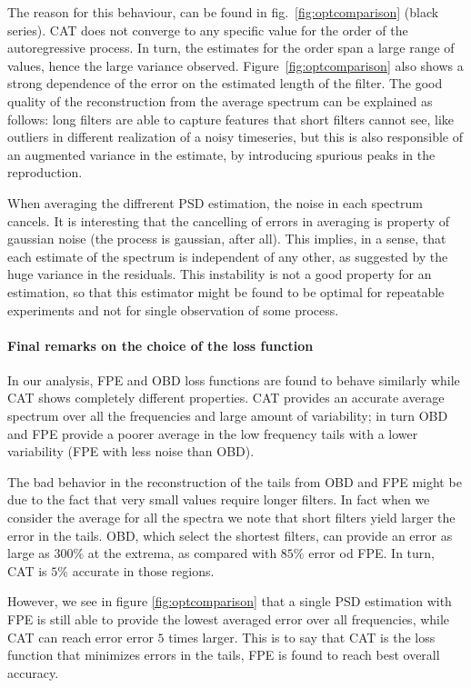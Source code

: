 \documentclass[twocolumn,showpacs,preprintnumbers,nofootinbib,prd,
superscriptaddress,10pt]{revtex4-1}
\begin{document}
The reason for this behaviour, can be found in fig.~\ref{fig:optcomparison} (black series). CAT does not converge to any specific value for the order of the autoregressive process.
In turn, the estimates for the order span a large range of values, hence the large variance observed.
Figure~\ref{fig:optcomparison} also shows a strong dependence of the error on the estimated length of the filter. The good quality of the reconstruction from the average spectrum can be explained as follows: long filters are able to capture features that short filters cannot see, like outliers in different realization of a noisy timeseries, but this is also responsible of an augmented variance in the estimate, by introducing spurious peaks in the reproduction.

When averaging the diffrerent PSD estimation, the noise in each spectrum cancels. It is interesting that the cancelling of errors in averaging is property of gaussian noise (the process is gaussian, after all). This implies, in a sense, that each estimate of the spectrum is independent of any other, as suggested by the huge variance in the residuals. This instability is not a good property for an estimation, so that this estimator might be found to be optimal for repeatable experiments and not for single observation of some process.

\paragraph{Final remarks on the choice of the loss function}

In our analysis, FPE and OBD loss functions are found to behave similarly while CAT shows completely different properties.
CAT provides an accurate average spectrum over all the frequencies and large amount of variability; in turn OBD and FPE provide a poorer average in the low frequency tails with a lower variability (FPE with less noise than OBD).

The bad behavior in the reconstruction of the tails from OBD and FPE might be due to the fact that very small values require longer filters. 
In fact when we consider the average for all the spectra we note that short filters yield larger the error in the tails. OBD, which select the shortest filters, can provide an error as large as $300 \%$ at the extrema, as compared with $85\%$ error od FPE. In turn, CAT is $5\%$ accurate in those regions.

However, we see in figure \ref{fig:optcomparison} that a single PSD estimation with FPE is still able to provide the lowest averaged error over all frequencies, while CAT can reach error error $5$ times larger.
This is to say that CAT is the loss function that minimizes errors in the tails, FPE is found to reach best overall accuracy. 
\end{document}
